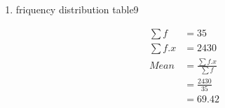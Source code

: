 \renewcommand{\theequation}{\theenumi}
\begin{enumerate}[label=\arabic*.,ref=\thesubsection.\theenumi]
\item \begin{table}[!ht]
	\centering
	
	\caption{friquency distribution table9 }
\end{table}
\begin{align}
\sum{f} &= 35
\\
\sum{f.x} &= 2430
\\
Mean &= \frac{\sum{f.x}}{\sum{f}}
\\ &= \frac{2430}{35}
\\&= 69.42
\end{align}
\end{enumerate}